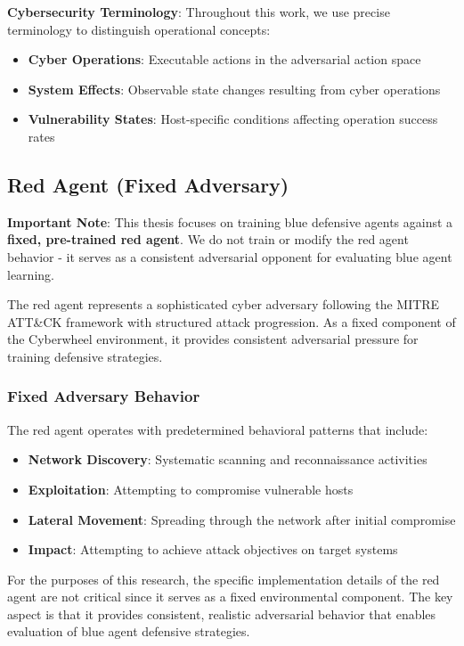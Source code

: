 \documentclass[12pt,twoside]{article}
\theoremstyle{definition}
\theoremstyle{plain}
\begin{document}
\textbf{Cybersecurity Terminology}: Throughout this work, we use precise terminology to distinguish operational concepts:
\begin{itemize}
\item \textbf{Cyber Operations}: Executable actions in the adversarial action space
\item \textbf{System Effects}: Observable state changes resulting from cyber operations
\item \textbf{Vulnerability States}: Host-specific conditions affecting operation success rates
\end{itemize}

\subsection{Red Agent (Fixed Adversary)}

\textbf{Important Note}: This thesis focuses on training blue defensive agents against a \textbf{fixed, pre-trained red agent}. We do not train or modify the red agent behavior - it serves as a consistent adversarial opponent for evaluating blue agent learning.

The red agent represents a sophisticated cyber adversary following the MITRE ATT\&CK framework with structured attack progression. As a fixed component of the Cyberwheel environment, it provides consistent adversarial pressure for training defensive strategies.

\subsubsection{Fixed Adversary Behavior}
The red agent operates with predetermined behavioral patterns that include:
\begin{itemize}
\item \textbf{Network Discovery}: Systematic scanning and reconnaissance activities
\item \textbf{Exploitation}: Attempting to compromise vulnerable hosts
\item \textbf{Lateral Movement}: Spreading through the network after initial compromise
\item \textbf{Impact}: Attempting to achieve attack objectives on target systems
\end{itemize}

For the purposes of this research, the specific implementation details of the red agent are not critical since it serves as a fixed environmental component. The key aspect is that it provides consistent, realistic adversarial behavior that enables evaluation of blue agent defensive strategies.
\end{document}
